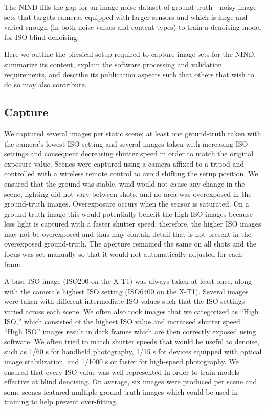 The \acf{NIND} fills the gap for an image noise dataset of ground-truth - noisy image sets that targets cameras equipped with larger sensors and which is large and varied enough (in both noise values and content types) to train a denoising model for ISO-blind denoising.%

Here we outline the physical setup required to capture image sets for the \ac{NIND}, summarize its content, explain the software processing and validation requirements, and describe its publication aspects such that others that wish to do so may also contribute.
\subsection{Capture}
We captured several images per static scene; at least one ground-truth taken with the camera's lowest ISO setting and several images taken with increasing ISO settings and consequent decreasing shutter speed in order to match the original exposure value. Scenes were captured using a camera affixed to a tripod and controlled with a wireless remote control to avoid shifting the setup position. We ensured that the ground was stable, wind would not cause any change in the scene, lighting did not vary between shots, and no area was overexposed in the ground-truth images. Overexposure occurs when the sensor is saturated. On a ground-truth image this would potentially benefit the high ISO images because less light is captured with a faster shutter speed; therefore, the higher ISO images may not be overexposed and thus may contain detail that is not present in the overexposed ground-truth. The aperture remained the same on all shots and the focus was set manually so that it would not automatically adjusted for each frame.

A base ISO image (ISO200 on the \acf{X-T1}) was always taken at least once, along with the camera's highest ISO setting (ISO6400 on the \acs{X-T1}). Several images were taken with different intermediate ISO values such that the ISO settings varied across each scene. We often also took images that we categorized as ``High ISO,'' which consisted of the highest ISO value and increased shutter speed. ``High ISO'' images result in dark frames which are then correctly exposed using software. We often tried to match shutter speeds that would be useful to denoise, such as 1/60 s for handheld photography, 1/15 s for devices equipped with optical image stabilization, and 1/1000 s or faster for high-speed photography. We ensured that every ISO value was well represented in order to train models effective at blind denoising. On average, six images were produced per scene and some scenes featured multiple ground truth images which could be used in training to help prevent over-fitting.
